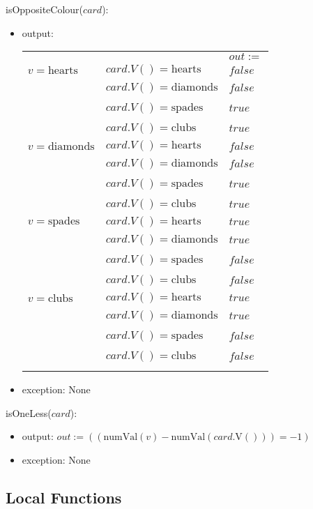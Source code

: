\documentclass[12pt]{article}
\begin{document}
\noindent isOppositeColour($card$):
\begin{itemize}
\item output: 
\begin{tabular}{|p{3.6cm}|p{4.0cm}|l|}
\hhline{~|~|-|}
\multicolumn{1}{r}{} & \multicolumn{1}{r|}{} & \multicolumn{1}{l|}{$out := $}\\
\hhline{|-|-|-|}
$v = \mbox{hearts}$ & $card.V() = \mbox{hearts}$ & $false$\\
\hhline{|~|-|-|}
~ & $card.V() = \mbox{diamonds}$ & $false$\\
\hhline{|~|-|-|}
~ & $card.V() = \mbox{spades}$ & $true$\\
\hhline{|~|-|-|}
~ & $card.V() = \mbox{clubs}$ & $true$\\
\hhline{|-|-|-|}
$v = \mbox{diamonds}$ & $card.V() = \mbox{hearts}$ & $false$\\
\hhline{|~|-|-|}
~ & $card.V() = \mbox{diamonds}$ & $false$\\
\hhline{|~|-|-|}
~ & $card.V() = \mbox{spades}$ & $true$\\
\hhline{|~|-|-|}
~ & $card.V() = \mbox{clubs}$ & $true$\\
\hhline{|-|-|-|}
$v = \mbox{spades}$ & $card.V() = \mbox{hearts}$ & $true$\\
\hhline{|~|-|-|}
~ & $card.V() = \mbox{diamonds}$ & $true$\\
\hhline{|~|-|-|}
~ & $card.V() = \mbox{spades}$ & $false$\\
\hhline{|~|-|-|}
~ & $card.V() = \mbox{clubs}$ & $false$\\
\hhline{|-|-|-|}
$v = \mbox{clubs}$ & $card.V() = \mbox{hearts}$ & $true$\\
\hhline{|~|-|-|}
~ & $card.V() = \mbox{diamonds}$ & $true$\\
\hhline{|~|-|-|}
~ & $card.V() = \mbox{spades}$ & $false$\\
\hhline{|~|-|-|}
~ & $card.V() = \mbox{clubs}$ & $false$\\
\hhline{|-|-|-|}
\end{tabular}
\item exception: None
\end{itemize}

\noindent isOneLess($card$):
\begin{itemize}
\item output: $out := ((\mbox{numVal}(v)-\mbox{numVal}(card.\mbox{V}())) = -1)$
\item exception: None
\end{itemize}
\subsection*{Local Functions}
\end{document}
